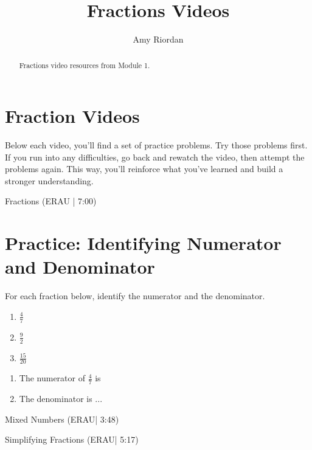 \documentclass{ximera}
\title{Fractions Videos}
\author{Amy Riordan}
\begin{document}
\begin{abstract}
Fractions video resources from Module 1.
\end{abstract}
\maketitle

\section*{Fraction Videos}

Below each video, you’ll find a set of practice problems. Try those problems first. If you run into any difficulties, go back and rewatch the video, then attempt the problems again. This way, you’ll reinforce what you’ve learned and build a stronger understanding.

Fractions (ERAU | 7:00)



\section*{Practice: Identifying Numerator and Denominator}

For each fraction below, identify the numerator and the denominator.

\begin{enumerate}
    \item $\frac{4}{7}$
    \item $\frac{9}{2}$
    \item $\frac{15}{20}$
\end{enumerate}


\begin{problem}
\begin{enumerate}
\item The numerator of $\frac{4}{7}$ is 
 
\item The denominator is ...
 
\end{enumerate}
\end{problem}

Mixed Numbers (ERAU| 3:48)


Simplifying Fractions (ERAU| 5:17)
\end{document}
